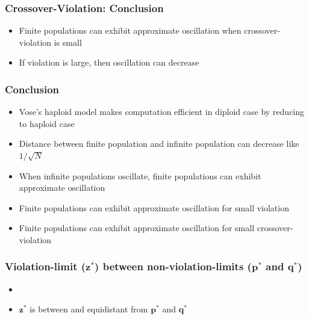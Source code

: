 \documentclass[aspectratio=169]{beamer}
\begin{document}
  \begin{frame}
    \frametitle{Crossover-Violation: Conclusion}
    \begin{itemize}
      \setlength\itemsep{1em}
      \item{Finite populations can exhibit approximate oscillation when crossover-violation is small} 
      \item{If violation is large, then oscillation can decrease}     
      
    \end{itemize}
  \end{frame}
  
  \begin{frame}
    \frametitle{Conclusion}
    \begin{itemize}
      \setlength\itemsep{1em}
      \item{Vose's haploid model makes computation efficient in diploid case by reducing to haploid case} 
      \item{Distance between finite population and infinite population can decrease like $1/\sqrt{N}$}
      \item{When infinite populations oscillate, finite populations can exhibit approximate oscillation}
      \item{Finite populations can exhibit approximate oscillation for small violation}
      \item{Finite populations can exhibit approximate oscillation for small crossover-violation}      
    \end{itemize}
  \end{frame}
  
  \begin{frame}
    \frametitle{Violation-limit ($\bm{z}^\ast$) between non-violation-limits ($\bm{p}^\ast$ and $\bm{q}^\ast$)}
    \begin{itemize}
      \item 
      \centering
      \item $\bm{z}^\ast$ is between and equidistant from $\bm{p}^\ast$ and $\bm{q}^\ast$
    \end{itemize}
  \end{frame}
  
\end{document}
